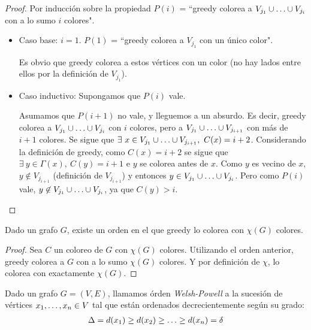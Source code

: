 \begin{proof}
Por inducción sobre la propiedad $P(i)$ = ``greedy colorea a $V_{j_1} \cup \mathellipsis \cup V_{j_i}$ con a lo sumo $i$ colores".
\begin{itemize}
    \item Caso base: $i = 1$. $P(1)$ = ``greedy colorea a $V_{j_1}$ con un único color".
    
    Es obvio que greedy colorea a estos vértices con un color (no hay lados entre ellos por la definición de $V_{j_1}$).
    
    \item Caso inductivo: Supongamos que $P(i)$ vale.
    
    Asumamos que $P(i+1)$ no vale, y lleguemos a un absurdo. Es decir, greedy colorea a $V_{j_1} \cup \mathellipsis \cup V_{j_i}$ con $i$ colores, pero a $V_{j_1} \cup \mathellipsis \cup V_{j_{i+1}}$ con más de $i + 1$ colores. Se sigue que $\exists~x \in V_{j_1} \cup \mathellipsis \cup V_{j_{i+1}},~C(x) = i + 2$. Considerando la definición de greedy, como $C(x) = i + 2$ se sigue que  $\exists~y \in \Gamma(x),~ C(y) = i + 1$ e $y$ se colorea antes de $x$. Como $y$ es vecino de $x$, $y \not\in V_{j_{i+1}}$ (definición de $V_{j_{i+1}}$) y entonces $y \in V_{j_1} \cup \mathellipsis \cup V_{j_i}$. Pero como $P(i)$ vale, $y \not\in V_{j_1} \cup \mathellipsis \cup V_{j_i}$, ya que $C(y) > i$.
 \end{itemize}
\end{proof}

\begin{corollary}
Dado un grafo $G$, existe un orden en el que greedy lo colorea con $\chi(G)$ colores.
\end{corollary}
\begin{proof}
Sea $C$ un coloreo de $G$ con $\chi(G)$ colores. Utilizando el orden anterior, greedy colorea a $G$ con a lo sumo $\chi(G)$ colores. Y por definición de $\chi$, lo colorea con exactamente $\chi(G)$.
\end{proof}

\begin{definition}
Dado un grafo $G=(V,E)$, llamamos órden \emph{Welsh-Powell} a la sucesión de vértices $x_1, \mathellipsis, x_n \in V$ tal que están ordenados decrecientemente según su grado:
\begin{align}
    \Delta = d(x_1) \ge d(x_2) \ge \mathellipsis \ge d(x_n) = \delta
\end{align}
\end{definition}


